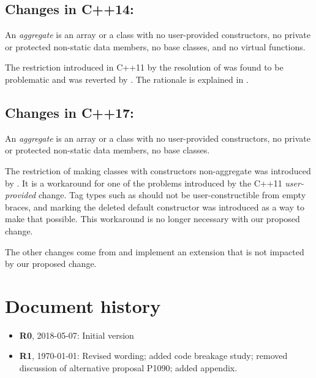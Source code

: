 \subsection*{Changes in C++14:}

\begin{adjustwidth}{1cm}{1cm}
An \emph{aggregate} is an array or a class with no user-provided constructors, no private or protected non-static data members, no base classes, and no virtual functions.
\end{adjustwidth}

The restriction introduced in C++11 by the resolution of \cite{CWG886} was found to be problematic and was reverted by \cite{N3653}. The rationale is explained in \cite{N3605}.

\subsection*{Changes in C++17:}

\begin{adjustwidth}{1cm}{1cm}
An \emph{aggregate} is an array or a class with no user-provided constructors, no private or protected non-static data members, no  base classes.
\end{adjustwidth}

The restriction of making classes with  constructors non-aggregate was introduced by \cite{P0017}. It is a workaround for one of the problems introduced by the C++11 \emph{user-provided} change. Tag types such as  should not be user-constructible from empty braces, and marking the deleted default constructor   was introduced as a way to make that possible. This workaround is no longer necessary with our proposed change.

The other changes come from \cite{P0398} and implement an extension that is not impacted by our proposed change.

\pagebreak
\section*{Document history}

\begin{itemize}
\item \textbf{R0}, 2018-05-07: Initial version
\item \textbf{R1}, \today: Revised wording; added code breakage study; removed discussion of alternative proposal P1090; added appendix.
\end{itemize}


